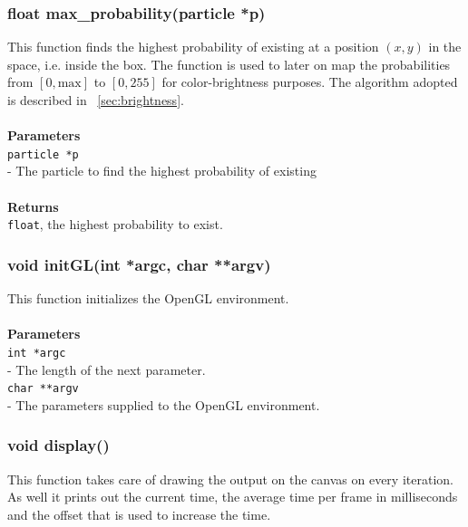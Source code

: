 \documentclass[a4paper, 10pt]{article}
\def\mar{\hspace*{5mm}}
\begin{document}
        \vspace{1cm}
        \subsubsection{float max\_probability(particle *p)}
        This function finds the highest probability of existing at a position $(x, y)$
        in the space, i.e. inside the box. The function is used to later on map the
        probabilities from $[0, \text{max}]$ to $[0, 255]$ for color-brightness purposes.
        The algorithm adopted is described in ~\ref{sec:brightness}.\\
        \\{\bf Parameters}\\
        \verb|particle *p|\\\mar- The particle to find the highest probability of existing\\
        \\{\bf Returns}\\
        \verb|float|, the highest probability to exist.

        \vspace{1cm}
        \subsubsection{void initGL(int *argc, char **argv)}
        This function initializes the OpenGL environment.\\
        \\{\bf Parameters}\\
        \verb|int *argc|\\\mar- The length of the next parameter.\\
        \verb|char **argv|\\\mar- The parameters supplied to the OpenGL environment.
        
        \vspace{1cm}
        \subsubsection{void display()}
        This function takes care of drawing the output on the canvas on every iteration.
        As well it prints out the current time, the average time per frame in milliseconds
        and the offset that is used to increase the time.

        \vspace{1cm}
\end{document}
